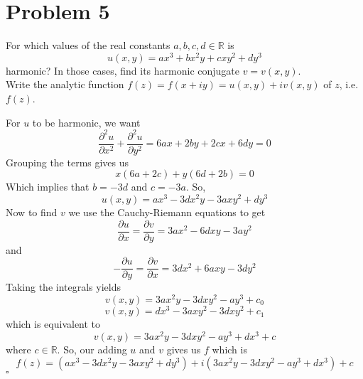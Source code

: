 \documentclass[12pt]{article}
\newcommand{\R}{\mathbb{R}}
\newenvironment{proof}{\noindent{\bf Proof.}}{\hfill $\square$\medskip}
\begin{document}
\newpage
\section{Problem 5}
For which values of the real constants $a,b,c,d\in\R$ is
$$u(x,y)=ax^{3}+bx^{2}y+cxy^{2}+dy^{3}$$
harmonic? In those cases, find its harmonic conjugate $v=v(x,y)$.\\
Write the analytic function $f(z)=f(x+iy)=u(x,y)+iv(x,y)$ of $z$, i.e. $f(z)$.

\begin{proof}
For $u$ to be harmonic, we want
$$
\frac{\partial^{2}u}{\partial x^{2}}+\frac{\partial^{2}u}{\partial y^{2}}=6ax+2by+2cx+6dy=0
$$
Grouping the terms gives us
$$x(6a+2c)+y(6d+2b)=0$$
Which implies that $b=-3d$ and $c=-3a$. So, $$u(x,y)=ax^{3}-3dx^{2}y-3axy^{2}+dy^{3}$$
Now to find $v$ we use the Cauchy-Riemann equations to get
$$\frac{\partial u}{\partial x}=\frac{\partial v}{\partial y}=3ax^{2}-6dxy-3ay^{2}$$
and
$$-\frac{\partial u}{\partial y}=\frac{\partial v}{\partial x}=3dx^{2}+6axy-3dy^{2}$$
Taking the integrals yields
$$v(x,y)=3ax^{2}y-3dxy^{2}-ay^{3}+c_{0}$$
$$v(x,y)=dx^{3}-3axy^{2}-3dxy^{2}+c_{1}$$
which is equivalent to
$$v(x,y)=3ax^{2}y-3dxy^{2}-ay^{3}+dx^{3}+c$$
where $c\in\R$. So, our adding $u$ and $v$ gives us $f$ which is
$$f(z)=(ax^{3}-3dx^{2}y-3axy^{2}+dy^{3})+i(3ax^{2}y-3dxy^{2}-ay^{3}+dx^{3})+c$$
\end{proof}
\end{document}
